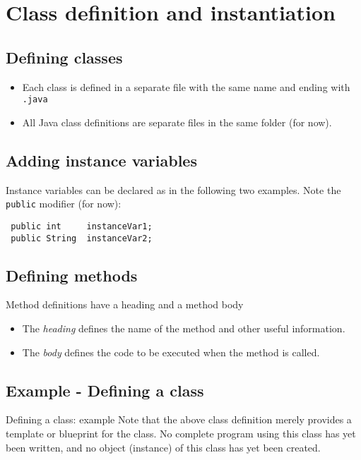 \documentclass[abstracton]{scrartcl}
\begin{document}
\section{Class definition and instantiation}
\subsection{Defining classes}

    \begin{itemize}
    \item Each class is defined in a separate file with the same name and
    ending with \lstinline!.java!
  \item All Java class definitions are separate files in the same
    folder (for now).
    \end{itemize}

\subsection{Adding instance variables}

Instance variables can be declared as in the following two examples. Note the \lstinline!public! modifier (for now):
\begin{lstlisting}
 public int     instanceVar1;
 public String  instanceVar2;
\end{lstlisting}

\subsection{Defining methods}

Method definitions have a heading and a method body
  \begin{itemize}
  \item The \emph{heading} defines the name of the method 
  and other useful information.
  \item The \emph{body} defines the code to be executed when the method
  is called.
  \end{itemize}

\newpage
\subsection{Example - Defining a class}



Defining a class: example
Note that the above class definition  merely provides a template or blueprint for the class. No complete program using this class has yet been written, and no object (instance) of this class has yet been created. 
\end{document}
